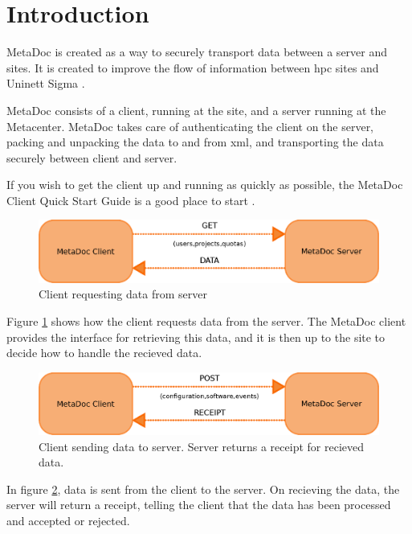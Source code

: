 \newpage
\section{Introduction}
MetaDoc is created as a way to securely transport data between a server and 
sites. It is created to improve the flow of information between \gls{hpc} sites
and Uninett Sigma \cite{improvingflow}.

MetaDoc consists of a client, running at the site, and a server running at the
Metacenter. MetaDoc takes care of authenticating the client on the server,
packing and unpacking the data to and from \gls{xml}, and transporting the data
securely between client and server. 

If you wish to get the client up and running as quickly as possible, the
MetaDoc Client Quick Start Guide is a good place to start
\cite{quick_start_guide}.

\begin{figure}[h!]
    \includegraphics[width=\textwidth]{img/get_data}
    \caption{Client requesting data from server}
    \label{fig:get_data}
\end{figure}

Figure \ref{fig:get_data} shows how the client requests data from the server.
The MetaDoc client provides the interface for retrieving this data, and it is
then up to the site to decide how to handle the recieved data. 

\begin{figure}[h!]
    \includegraphics[width=\textwidth]{img/post_data}
    \caption{Client sending data to server. Server returns a receipt for
    recieved data.}
    \label{fig:post_data}
\end{figure}

In figure \ref{fig:post_data}, data is sent from the client to the server. On
recieving the data, the server will return a receipt, telling the client that
the data has been processed and accepted or rejected. 

